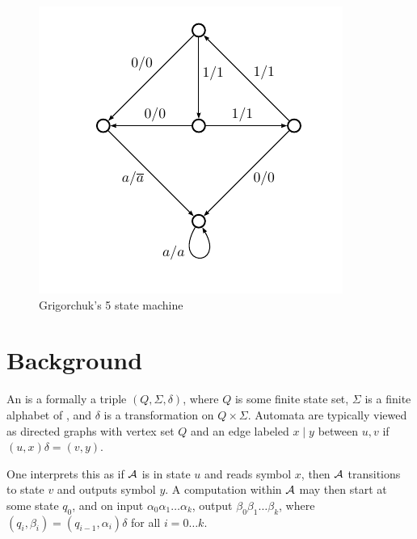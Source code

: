 \documentclass[11pt]{article}
\begin{document}
\begin{figure}
\begin{center}
\includegraphics[scale=0.5]{figures/grigorchuk}
\end{center}
\caption{Grigorchuk's 5 state machine}
\end{figure}

\section{Background}
An  is a formally a triple $(Q, \Sigma, \delta)$,
where $Q$ is some finite state set, $\Sigma$ is a finite alphabet of
, and $\delta$ is a transformation on $Q \times \Sigma$.
Automata are typically viewed as directed graphs with vertex set $Q$
and an edge labeled $x \mid y$ between $u, v$ if $(u, x)\delta = (v, y)$.

\begin{center}
\end{center}

One interprets this as if $\mathcal{A}$ is in state $u$ and reads symbol $x$,
then $\mathcal{A}$ transitions to state $v$ and outputs symbol $y$. A
computation within $\mathcal{A}$ may then start at some state $q_0$, and on
input $\alpha_0 \alpha_1 \ldots \alpha_k$, output
$\beta_0 \beta_1 \ldots \beta_k$, where
$(q_i, \beta_i) = (q_{i-1}, \alpha_i)\delta$ for all $i = 0\ldots k$.
\end{document}

